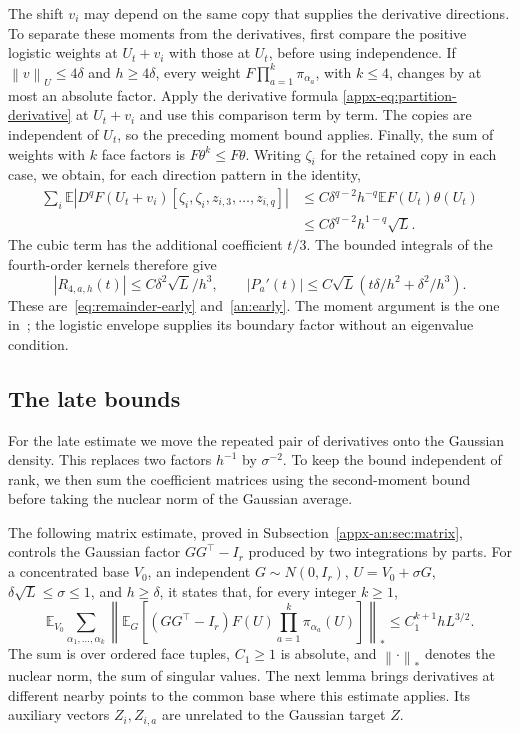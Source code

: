 \documentclass[11pt,letterpaper]{article}
\theoremstyle{remark}
\newcommand{\E}{\mathbb E}
\newcommand{\norm}[1]{\left\lVert#1\right\rVert}
\begin{document}
The shift \(v_i\) may depend on the same copy that supplies the
derivative directions. To separate these moments from the derivatives,
first compare the positive logistic weights at \(U_t+v_i\) with
those at \(U_t\), before using independence. If
\(\norm v_U\le4\delta\) and \(h\ge4\delta\), every weight
\(F\prod_{a=1}^k\pi_{\alpha_a}\), with \(k\le4\), changes by
at most an absolute factor. Apply the derivative formula
\eqref{appx-eq:partition-derivative} at \(U_t+v_i\) and use
this comparison term by term. The copies are independent of \(U_t\),
so the preceding moment bound applies. Finally,
the sum of weights with \(k\) face factors is
\(F\theta^k\le F\theta\). Writing \(\zeta_i\) for the retained
copy in each case, we obtain, for each direction pattern in the identity,
\[
 \begin{aligned}
 \sum_i\E\left|D^qF(U_t+v_i)
       [\zeta_i,\zeta_i,z_{i,3},\ldots,z_{i,q}]\right|
 &\le C\delta^{q-2}h^{-q}\E F(U_t)\theta(U_t)\\
 &\le C\delta^{q-2}h^{1-q}\sqrt L.
 \end{aligned}
\]
The cubic term has the additional coefficient \(t/3\).
The bounded integrals of the fourth-order kernels therefore give
\[
 |R_{4,a,h}(t)|\le C\delta^2\sqrt L/h^3,\qquad
 |P_a'(t)|\le C\sqrt L
       \left(t\delta/h^2+\delta^2/h^3\right).
\]
These are~\eqref{eq:remainder-early} and~\eqref{an:early}.
The moment argument is the one in~\cite[Lemma~4.1]{AL}; the
logistic envelope supplies its boundary factor without an eigenvalue
condition.

\subsection{The late bounds}
\label{appx-an:sec:restoration}

For the late estimate we move the repeated pair of derivatives onto
the Gaussian density. This replaces two factors \(h^{-1}\) by
\(\sigma^{-2}\). To keep the bound independent of rank, we then
sum the coefficient matrices using the second-moment bound before
taking the nuclear norm of the Gaussian average.

The following matrix estimate, proved in
Subsection~\ref{appx-an:sec:matrix}, controls the Gaussian factor
\(GG^\top-I_r\) produced by two integrations by parts. For a concentrated base \(V_0\),
an independent \(G\sim N(0,I_r)\), \(U=V_0+\sigma G\),
\(\delta\sqrt L\le\sigma\le1\), and \(h\ge\delta\), it states
that, for every integer \(k\ge1\),
\begin{equation}
 \E_{V_0}\sum_{\alpha_1,\ldots,\alpha_k}
 \left\|\E_G\left[(GG^\top-I_r)F(U)
              \prod_{a=1}^k\pi_{\alpha_a}(U)\right]\right\|_*
 \le C_1^{k+1}hL^{3/2}.
 \label{appx-an:matrix-bound}
\end{equation}
The sum is over ordered face tuples, \(C_1\ge1\) is absolute,
and \(\norm{\cdot}_*\) denotes the nuclear norm, the sum of singular
values. The next lemma brings derivatives at different nearby points
to the common base where this estimate applies. Its auxiliary vectors \(Z_i,Z_{i,a}\) are unrelated to the
Gaussian target \(Z\).
\end{document}

